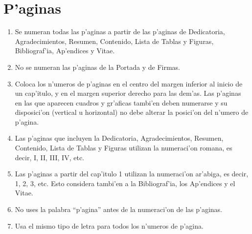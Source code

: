 \section{P'aginas}
\noindent
\begin{enumerate}
	\item Se numeran todas las p'aginas a partir de las p'aginas de Dedicatoria, Agradecimientos, Resumen, Contenido, Lista de Tablas y Figuras, Bibliograf'ia, Ap'endices y Vitae.
	\item No se numeran las p'aginas de la Portada y de Firmas.
	\item Coloca los n'umeros de p'aginas en el centro del margen inferior al inicio de un cap'itulo, y en el margen superior derecho para las dem'as. Las p'aginas en las que aparecen cuadros y gr'aficas tambi'en deben numerarse y su disposici'on (vertical u horizontal) no debe alterar la posici'on del n'umero de p'agina.
	\item Las p'aginas que incluyen la Dedicatoria, Agradecimientos, Resumen, Contenido, Lista de Tablas y Figuras utilizan la numeraci'on romana, es decir, I, II, III, IV, etc.
	\item Las p'aginas a partir del cap'itulo 1 utilizan la numeraci'on ar'abiga, es decir, 1, 2, 3, etc. Esto considera tambi'en a la Bibliograf'ia, los Ap'endices y el Vitae.
	\item No uses la palabra ``p'agina'' antes de la numeraci'on de las p'aginas.
	\item Usa el mismo tipo de letra para todos los n'umeros de p'agina.
\end{enumerate}

